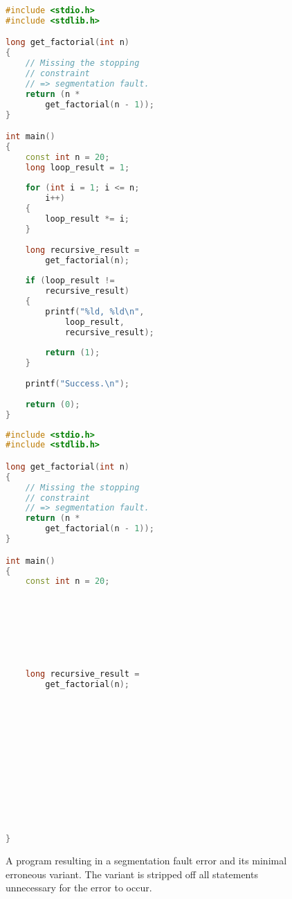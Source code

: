 \begin{figure}[p]
\begin{minipage}{0.46\textwidth}
\begin{lstlisting}[basicstyle=\small, caption=Program $\mathcal{P}$.,
  language=C++, label={lst:reductionoriginal}]
#include <stdio.h>
#include <stdlib.h>

long get_factorial(int n)
{
	// Missing the stopping 
	// constraint 
	// => segmentation fault.
	return (n * 
		get_factorial(n - 1));
}

int main()
{
	const int n = 20;
	long loop_result = 1;
	
	for (int i = 1; i <= n; 
		i++)
	{
		loop_result *= i;
	}
	
	long recursive_result = 
		get_factorial(n);
	
	if (loop_result != 
		recursive_result)
	{
		printf("%ld, %ld\n", 
			loop_result, 
			recursive_result);
			
		return (1);
	}
	
	printf("Success.\n");
	
	return (0);
}
\end{lstlisting}
\end{minipage}
\hfill
\begin{minipage}{.45\textwidth}
\begin{lstlisting}[basicstyle=\small, caption=Minimal va\-riant $\mathcal{P'}$., 
  language=C++, numbers=right,
  label={lst:reductionminimal}]
#include <stdio.h>
#include <stdlib.h>

long get_factorial(int n)
{
	// Missing the stopping 
	// constraint 
	// => segmentation fault.
	return (n * 
		get_factorial(n - 1));
}

int main()
{
	const int n = 20;
	
	
	
	
	
	
	
	
	long recursive_result = 
		get_factorial(n);
	
	
	
	
	
	
	
	
	
	
	
	
	
	
}
\end{lstlisting}
\end{minipage}
\caption{A program resulting in a segmentation fault error and its 
minimal erroneous variant. 
The variant is stripped off all statements unnecessary for the error 
to occur. }
\label{lst:reductionexample}
\end{figure}

